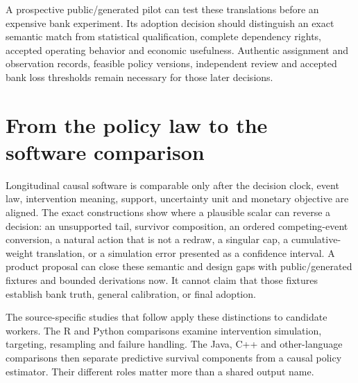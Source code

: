 A prospective public/generated pilot can test these translations before an
expensive bank experiment. Its adoption decision should distinguish an exact
semantic match from statistical qualification, complete dependency rights,
accepted operating behavior and economic usefulness. Authentic assignment and
observation records, feasible policy versions, independent review and accepted
bank loss thresholds remain necessary for those later decisions.
\citep{exec17_s5_design}



\section{From the policy law to the software comparison}
\label{exec17:s5-end}

Longitudinal causal software is comparable only after the decision clock,
event law, intervention meaning, support, uncertainty unit and monetary
objective are aligned. The exact constructions show where a plausible scalar
can reverse a decision: an unsupported tail, survivor composition, an ordered
competing-event conversion, a natural action that is not a redraw, a singular
cap, a cumulative-weight translation, or a simulation error presented as a
confidence interval. A product proposal can close these semantic and design
gaps with public/generated fixtures and bounded derivations now. It cannot
claim that those fixtures establish bank truth, general calibration, or final
adoption.

The source-specific studies that follow apply these distinctions to candidate
workers. The R and Python comparisons examine intervention simulation,
targeting, resampling and failure handling. The Java, C++ and other-language
comparisons then separate predictive survival components from a causal policy
estimator. Their different roles matter more than a shared output name.
